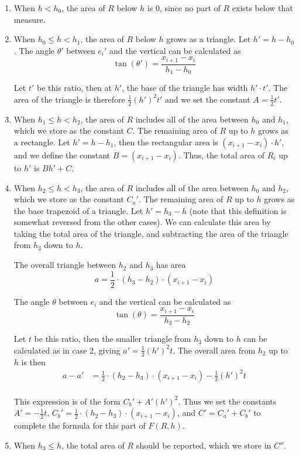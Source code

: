 \begin{enumerate}
\item When $h < h_0$, the area of $R$ below $h$ is 0, since no part of $R$ exists below that measure.

\item When $h_0 \leq h < h_1$, the area of $R$ below $h$ grows as a triangle. Let $h' = h - h_0$.
The angle $\theta'$ between $e_i'$ and the vertical can be calculated as 
\[ 
\tan(\theta') = \frac{x_{i+1} - x_i}{h_1 - h_0}
\]

Let $t'$ be this ratio, then at $h'$, the base of the triangle has width $h' \cdot t'$. The area of the triangle is therefore $\frac{1}{2} (h')^2 t'$ and we set the constant $A = \frac{1}{2} t'$.

\item When $h_1 \leq h < h_2$, the area of $R$ includes all of the area between $h_0$ and $h_1$, which we store as the constant $C$.
The remaining area of $R$ up to $h$ grows as a rectangle.
Let $h' = h - h_1$, then the rectangular area is $(x_{i+1} - x_i)\cdot h'$, and we define the constant $B = (x_{i+1} - x_i)$.
Thus, the total area of $R_i$ up to $h'$ is $Bh' + C$.

\item When $h_2 \leq h < h_3$, the area of $R$ includes all of the area between $h_0$ and $h_2$, which we store as the constant $C_a'$.
The remaining area of $R$ up to $h$ grows as the base trapezoid of a triangle.
Let $h' = h_3 - h$ (note that this definition is somewhat reversed from the other cases).
We can calculate this area by taking the total area of the triangle, and subtracting the area of the triangle from $h_3$ down to $h$.  

The overall triangle between $h_2$ and $h_3$ has area 
\[ 
a = \frac{1}{2} \cdot (h_3 - h_2) \cdot (x_{i+1} - x_i) 
\]

The angle $\theta$ between $e_i$ and the vertical can be calculated as
\[ 
\tan(\theta) = \frac{x_{i+1} - x_i}{h_3 - h_2}
\]

Let $t$ be this ratio, then the smaller triangle from $h_3$ down to $h$ can be calculated as in case 2, giving $a' = \frac{1}{2}(h')^2 t$. 
The overall area from $h_2$ up to $h$ is then
\[ 
\begin{split}
a - a' &= \frac{1}{2} \cdot (h_2 - h_3) \cdot (x_{i+1} - x_i) - \frac{1}{2}(h')^2 t \\
%
\end{split}
\]

This expression is of the form $C_b' + A'(h')^2$.
Thus we set the constants $A' = -\frac{1}{2}t$, $C_b' = \frac{1}{2} \cdot (h_2 - h_3) \cdot (x_{i+1} - x_i)$, and $C' = C_a' + C_b'$ to complete the formula for this part of $F(R, h)$.

\item When $h_3 \leq h$, the total area of $R$ should be reported, which we store in $C''$.

\end{enumerate}

